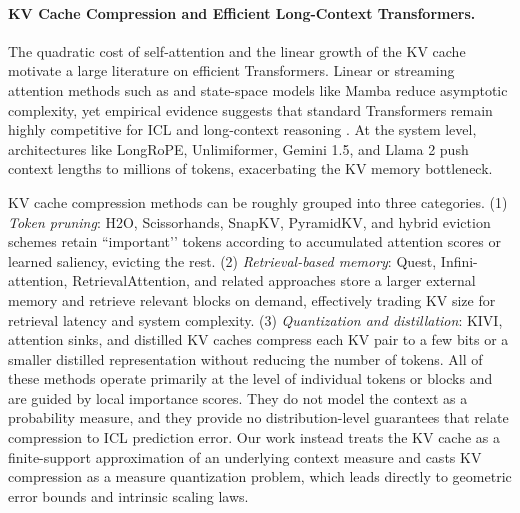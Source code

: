 \documentclass{article}
\theoremstyle{plain}
\theoremstyle{definition}
\theoremstyle{remark}
\begin{document}
\paragraph{KV Cache Compression and Efficient Long-Context Transformers.}
The quadratic cost of self-attention \citep{vaswani2017attention} and the linear growth  
of the KV cache motivate a large literature on efficient Transformers.  
Linear or streaming attention methods such as \citet{katharopoulos2020transformers}  
and state-space models like Mamba \citep{gu2024mamba} reduce asymptotic complexity,  
yet empirical evidence suggests that standard Transformers remain highly competitive  
for ICL and long-context reasoning \citep{bietti2024birth}.  
At the system level, architectures like LongRoPE, Unlimiformer, Gemini 1.5, and  
Llama 2 \citep{ding2024longrope,bertsch2024unlimiformer,team2024gemini,touvron2023llama}  
push context lengths to millions of tokens, exacerbating the KV memory bottleneck.

KV cache compression methods can be roughly grouped into three categories.  
(1) \emph{Token pruning}: H2O, Scissorhands, SnapKV, PyramidKV, and hybrid eviction schemes  
\citep{zhang2024h2o,liu2024scissorhands,li2024snapkv,zhang2024pyramidkv,ge2024model}  
retain “important’’ tokens according to accumulated attention scores or learned saliency,  
evicting the rest.  
(2) \emph{Retrieval-based memory}: Quest, Infini-attention, RetrievalAttention, and  
related approaches \citep{tang2024quest,munkhdalai2024leave,gao2024retrieval,bertsch2024unlimiformer}  
store a larger external memory and retrieve relevant blocks on demand, effectively  
trading KV size for retrieval latency and system complexity.  
(3) \emph{Quantization and distillation}: KIVI, attention sinks, and distilled KV caches  
\citep{liu2024kivi,xiao2024efficient,nawrot2024attention} compress each KV pair to a few  
bits or a smaller distilled representation without reducing the number of tokens.  
All of these methods operate primarily at the level of individual tokens or blocks and  
are guided by local importance scores.  They do not model the context as a probability  
measure, and they provide no distribution-level guarantees that relate compression to  
ICL prediction error.  Our work instead treats the KV cache as a finite-support  
approximation of an underlying context measure and casts KV compression as a measure  
quantization problem, which leads directly to geometric error bounds and intrinsic  
scaling laws.
\end{document}
